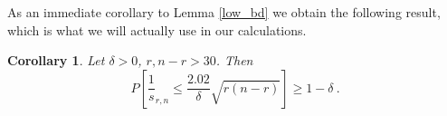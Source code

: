 \documentclass{article}
\newcommand{\red}[1]{\textcolor{red}{#1}}
\newtheorem{lemma}[theorem]{Lemma}
\newtheorem{corollary}[theorem]{Corollary}
\theoremstyle{definition}
\newcommand{\smin}{s_{r,n}}
\begin{document}
As an immediate corollary to Lemma \ref{low_bd} we obtain the following result, which is what we will actually use in our calculations.

\begin{corollary} 
 \label{lowbd}
 Let $\delta>0$, $r, n-r>30$. Then 
$$P\left [ \frac1\smin \leq \frac{2.02}{\delta}\sqrt{r(n-r)} \right] \geq 1-\delta~.$$
\end{corollary}





\end{document}
